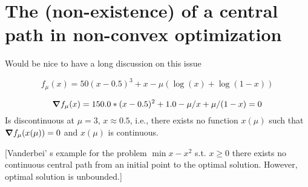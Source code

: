 \documentclass{article}
\begin{document}
\section{The (non-existence) of a central path in non-convex optimization}\label{app:non-existence-of-central-path}

Would be nice to have a long discussion on this issue

$$
f_{\mu}(x) = 50 (x - 0.5)^3 + x - \mu (\log(x) + \log(1 - x))
$$

$$
\grad f_{\mu}(x) = 150.0 * (x - 0.5)^2 + 1.0  - \mu / x + \mu / (1 - x) = 0 \\
$$
Is discontinuous at $\mu = 3$, $x \approx 0.5$, i.e., there exists no function $x(\mu)$ such that $\grad f_{\mu}(x(\mu)) = 0$ and $x(\mu)$ is continuous. 

[Vanderbei' s example for the problem $\min{ x -x^2}$ s.t. $x \ge 0$ there exists no continuous central path from an initial point to the optimal solution. However, optimal solution is unbounded.]

\end{document}

